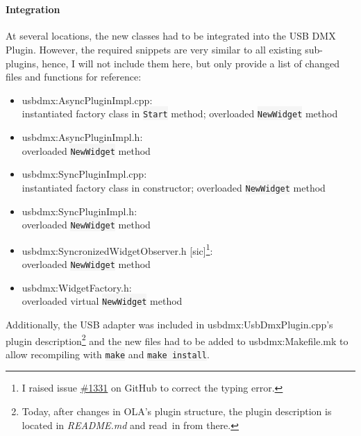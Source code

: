 ~

\paragraph{Integration}\label{integration}

At several locations, the new classes had to be integrated into the USB
DMX Plugin. However, the required snippets are very similar to all
existing sub-plugins, hence, I will not include them here, but only
provide a list of changed files and functions for reference:

\begin{itemize}
\tightlist
\item
  \gls{usbdmx:AsyncPluginImpl.cpp}:\\
  instantiated factory class in \colorbox{WhiteSmoke}{\lstinline!Start!} method; overloaded
  \colorbox{WhiteSmoke}{\lstinline!NewWidget!} method
\item
  \gls{usbdmx:AsyncPluginImpl.h}:\\
  overloaded \colorbox{WhiteSmoke}{\lstinline!NewWidget!} method
\item
  \gls{usbdmx:SyncPluginImpl.cpp}:\\
  instantiated factory class in constructor; overloaded
  \colorbox{WhiteSmoke}{\lstinline!NewWidget!} method
\item
  \gls{usbdmx:SyncPluginImpl.h}:\\
  overloaded \colorbox{WhiteSmoke}{\lstinline!NewWidget!} method
\item
  \gls{usbdmx:SyncronizedWidgetObserver.h} {[}sic{]}\footnote{I raised
    issue
    \href{https://github.com/OpenLightingProject/ola/issues/1331}{\#1331}
    on GitHub to correct the typing error.}:\\
  overloaded \colorbox{WhiteSmoke}{\lstinline!NewWidget!} method
\item
  \gls{usbdmx:WidgetFactory.h}:\\
  overloaded virtual \colorbox{WhiteSmoke}{\lstinline!NewWidget!} method
\end{itemize}

Additionally, the USB adapter was included in
\gls{usbdmx:UsbDmxPlugin.cpp}'s plugin description\footnote{Today, after
  changes in OLA's plugin structure, the plugin description is located
  in \emph{README.md} and read~in from there.} and the new files had to
be added to \gls{usbdmx:Makefile.mk} to allow recompiling with
\colorbox{WhiteSmoke}{\lstinline!make!} and \colorbox{WhiteSmoke}{\lstinline!make install!}.

